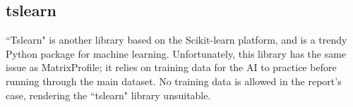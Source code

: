 \subsection{tslearn}
``Tslearn" is another library based on the Scikit-learn platform, and is a trendy Python package for machine learning. Unfortunately, this library has the same issue as MatrixProfile; it relies on training data for the AI to practice before running through the main dataset. No training data is allowed in the report's case, rendering the ``tslearn" library unsuitable.
